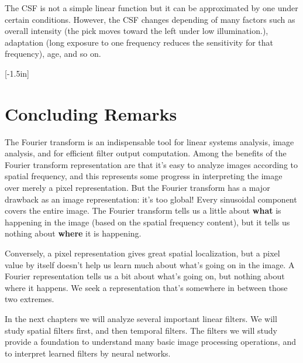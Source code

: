 The CSF is not a simple linear function but it can be approximated by one under certain conditions. However, the CSF changes depending of many factors such as overall intensity (the pick moves toward the left under low illumination.), adaptation (long exposure to one frequency reduces the sensitivity for that frequency), age, and so on. 

[-1.5in]


\section{Concluding Remarks}

The Fourier transform is an indispensable tool for linear systems analysis,
image analysis, and for efficient filter output computation.  
Among the benefits of the Fourier transform representation are that it's easy
to analyze images according to spatial frequency, and this represents some progress in interpreting the image over merely a pixel representation.  But the Fourier transform has a major drawback
as an image representation: it's too global!  Every sinusoidal
component covers the entire image.  The Fourier transform tells us a
little about {\bf what} is happening in the image (based on the spatial
frequency content), but it tells us nothing about {\bf where} it is happening.  

Conversely, a pixel representation gives great spatial localization, but a pixel value by itself doesn't help us learn much about what's going on in the image.  A Fourier representation tells us a bit about what's going on, but nothing about where it happens.  We seek a representation that's somewhere in between those two extremes.

In the next chapters we will analyze several important linear filters. We will study spatial filters first, and then temporal filters. The filters we will study provide a foundation to understand many basic image processing operations, and to interpret learned filters by neural networks.

